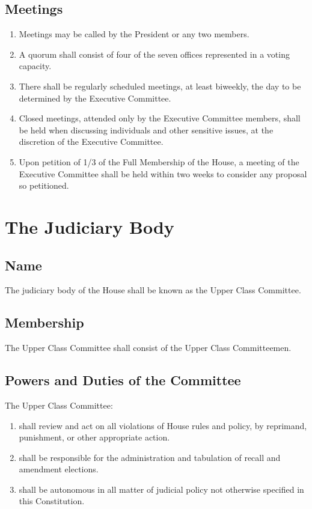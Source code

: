 \documentclass[10pt]{article} %
\begin{document}
\subsection{Meetings}
\begin{enumerate}
\item Meetings may be called by the President or any two members.
\item A quorum shall consist of four of the seven offices represented in a voting capacity.
\item There shall be regularly scheduled meetings, at least biweekly, the day to be determined by the Executive Committee.
\item Closed meetings, attended only by the Executive Committee members, shall be held when discussing individuals and other sensitive issues, at the discretion of the Executive Committee.
\item Upon petition of 1/3 of the Full Membership of the House, a meeting of the Executive Committee shall be held within two weeks to consider any proposal so petitioned.
\end{enumerate}
\section{The Judiciary Body}
\subsection{Name}
The judiciary body of the House shall be known as the Upper Class Committee.
\subsection{Membership}
The Upper Class Committee shall consist of the Upper Class Committeemen.
\subsection{Powers and Duties of the Committee}
The Upper Class Committee:
\begin{enumerate}
\item shall review and act on all violations of House rules and policy, by reprimand, punishment, or other appropriate action.
\item shall be responsible for the administration and tabulation of recall and amendment elections.
\item shall be autonomous in all matter of judicial policy not otherwise specified in this Constitution.
\end{enumerate}
\end{document}
